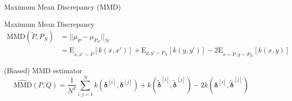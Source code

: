 \documentclass[student, noshadow, itr, english, aspectratio=169]{ITR_LSR_slides}
\begin{document}
\begin{frame}{Maximum Mean Discrepancy (MMD)}
\begin{block}{Maximum Mean Discrepancy}
\begin{equation*}
\begin{aligned}
\text{MMD}(\tilde{P}, P_N) &= ||\mu_{\tilde{P}} - \mu_{P_N} ||_{\mathcal{H}}\\
&= \text{E}_{x,x' \sim \tilde{P}}[k(x,x')] + \text{E}_{y,y' \sim P_N}[k(y,y')] - 2\text{E}_{x\sim \tilde{P}, y \sim P_N}[k(x,y)]
\end{aligned}
\end{equation*}
\end{block}

\begin{block}{(Biased) MMD estimator}
\begin{equation*}
\widehat{\text{MMD}} (P, Q) = \frac{1}{N^2} \sum_{i,j = 1}^N k(\boldsymbol{\delta}^{[i]}, \boldsymbol{\delta}^{[j]}) + k(\tilde{\boldsymbol{\delta}}^{[i]}, \tilde{\boldsymbol{\delta}}^{[j]}) - 2 k(\boldsymbol{\delta}^{[i]}, \tilde{\boldsymbol{\delta}}^{[j]})
\end{equation*}
\end{block}

\end{frame}
\end{document}
